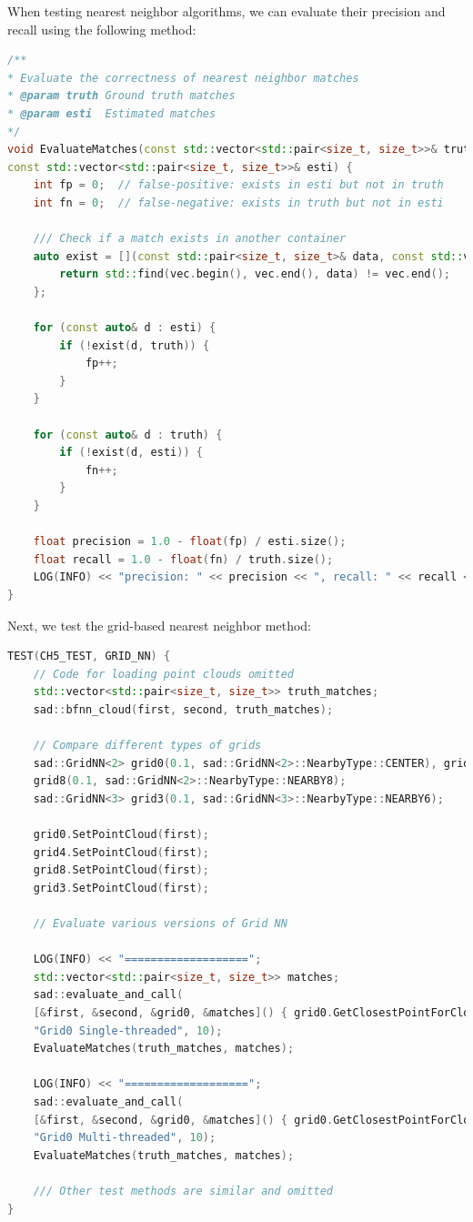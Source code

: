 When testing nearest neighbor algorithms, we can evaluate their precision and recall using the following method:
\begin{lstlisting}[language=c++,caption=src/ch5/test\_nn.cc]
/**
* Evaluate the correctness of nearest neighbor matches
* @param truth Ground truth matches
* @param esti  Estimated matches
*/
void EvaluateMatches(const std::vector<std::pair<size_t, size_t>>& truth,
const std::vector<std::pair<size_t, size_t>>& esti) {
	int fp = 0;  // false-positive: exists in esti but not in truth
	int fn = 0;  // false-negative: exists in truth but not in esti
	
	/// Check if a match exists in another container
	auto exist = [](const std::pair<size_t, size_t>& data, const std::vector<std::pair<size_t, size_t>>& vec) -> bool {
		return std::find(vec.begin(), vec.end(), data) != vec.end();
	};
	
	for (const auto& d : esti) {
		if (!exist(d, truth)) {
			fp++;
		}
	}
	
	for (const auto& d : truth) {
		if (!exist(d, esti)) {
			fn++;
		}
	}
	
	float precision = 1.0 - float(fp) / esti.size();
	float recall = 1.0 - float(fn) / truth.size();
	LOG(INFO) << "precision: " << precision << ", recall: " << recall << ", fp: " << fp << ", fn: " << fn;
}
\end{lstlisting}

Next, we test the grid-based nearest neighbor method:

\begin{lstlisting}[language=c++,caption=src/ch5/test\_nn.cc]
TEST(CH5_TEST, GRID_NN) {
	// Code for loading point clouds omitted
	std::vector<std::pair<size_t, size_t>> truth_matches;
	sad::bfnn_cloud(first, second, truth_matches);
	
	// Compare different types of grids
	sad::GridNN<2> grid0(0.1, sad::GridNN<2>::NearbyType::CENTER), grid4(0.1, sad::GridNN<2>::NearbyType::NEARBY4),
	grid8(0.1, sad::GridNN<2>::NearbyType::NEARBY8);
	sad::GridNN<3> grid3(0.1, sad::GridNN<3>::NearbyType::NEARBY6);
	
	grid0.SetPointCloud(first);
	grid4.SetPointCloud(first);
	grid8.SetPointCloud(first);
	grid3.SetPointCloud(first);
	
	// Evaluate various versions of Grid NN
	
	LOG(INFO) << "===================";
	std::vector<std::pair<size_t, size_t>> matches;
	sad::evaluate_and_call(
	[&first, &second, &grid0, &matches]() { grid0.GetClosestPointForCloud(first, second, matches); },
	"Grid0 Single-threaded", 10);
	EvaluateMatches(truth_matches, matches);
	
	LOG(INFO) << "===================";
	sad::evaluate_and_call(
	[&first, &second, &grid0, &matches]() { grid0.GetClosestPointForCloudMT(first, second, matches); },
	"Grid0 Multi-threaded", 10);
	EvaluateMatches(truth_matches, matches);
	
	/// Other test methods are similar and omitted
}
\end{lstlisting}

